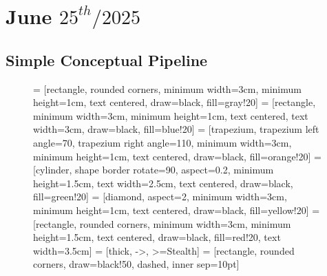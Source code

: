 \documentclass[../main.tex]{subfiles}
\begin{document}
\chapter{June $25^{th} / 2025$}
\label{ch:tufte-design}

\section{Simple Conceptual Pipeline }
\hrulefill

\usetikzlibrary{arrows.meta, positioning, shapes.geometric, fit}

\begin{figure}[htbp]
    \centering
    
     = [rectangle, rounded corners, minimum width=3cm, minimum height=1cm, text centered, draw=black, fill=gray!20]
     = [rectangle, minimum width=3cm, minimum height=1cm, text centered, text width=3cm, draw=black, fill=blue!20]
     = [trapezium, trapezium left angle=70, trapezium right angle=110, minimum width=3cm, minimum height=1cm, text centered, draw=black, fill=orange!20]
     = [cylinder, shape border rotate=90, aspect=0.2, minimum height=1.5cm, text width=2.5cm, text centered, draw=black, fill=green!20]
     = [diamond, aspect=2, minimum width=3cm, minimum height=1cm, text centered, draw=black, fill=yellow!20]
     = [rectangle, rounded corners, minimum width=3cm, minimum height=1.5cm, text centered, draw=black, fill=red!20, text width=3.5cm]
     = [thick, ->, >=Stealth]
     = [rectangle, rounded corners, draw=black!50, dashed, inner sep=10pt]

\end{figure}
\end{document}
